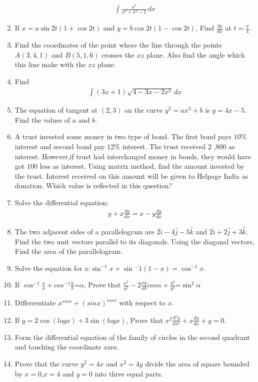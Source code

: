 \documentclass{article}
\begin{document}
\begin{enumerate}
	\begin{align*}
\int \frac{x^2}{x^4 + x^2 - 2} \, dx
		\end{align*}
\item If $x= a \sin 2t (1 + \cos 2t)$ and $y= b \cos 2t (1 - \cos 2t)$, Find $\frac{dy}{dx}$ at $ t = \frac{\pi}{4}$.
\item Find the coordinates of the point where the line through the points $ A(3,4,1) $ and $B(5,1,6)$ crosses the $xz$ plane. Also find the angle which this line make with the $xz$ plane.
\item Find \begin{align*}
		\int (3x+1)\sqrt {4-3x-2x^2} \, dx
\end{align*}
\item The equation of tangent at $(2,3)$ on the curve $y^2=ax^3+b$ is $y=4x-5$. Find the values of $a$ and $b$.
\item A trust invested some money in two type of bond. The first bond pays $10\%$ interest and second bond pay $12\%$ interest. The trust received \rupee $2$ ,$800$ as interest. However,if trust had interchanged money in bonds, they would have got \rupee $100$ less as interest. Using matrix method, find the amount invested by the trust. Interest received on this amount will be given to Helpage India as donation. Which value is reflected in this question?
\item Solve the differential equation:
	\begin{align*}
		y + x \frac{dy}{dx} = x - y \frac{dy}{dx}
	\end{align*}
\item The two adjacent sides of a parallelogram are  $ 2\hat{i}-4\hat{j}-5\hat{k} $ and $2\hat{i}+2\hat{j}+3\hat{k} $. Find the two unit vectors parallel to its diagonals. Using the diagonal vectors, Find the area of the parallelogram.
\item Solve the equation for x:$\sin^{-1}x+\sin{^-1}(1-x) = \cos^{-1}x$.
 \item If $\cos^{-1}\frac{x}{a}+cos^{-1}\frac{y}{b}$=$\alpha$, Prove that $\frac{x^2}{a^2}-2\frac{xy}{ab}cos\alpha+\frac{y^2}{b^2}$=$\sin^2\alpha$
 \item Differrentiate $x^{sinx}+(sinx)^{cosx}$ with respect to $x$.
 \item If $ y=2\cos(logx)+3\sin(logx)$, Prove that $x^2\frac{d^2y}{dx^2}+x\frac{dy}{dx}+y=0$.
 \item Form the differential equation of the family of circles in the second quadrant and touching the coordinate axes.
 \item Prove that the curve $y^2=4x$ and $x^2=4y$ divide the area of square bounded by $x=0$,$x=4$ and $y=0$ into three equal parts.

\end{enumerate}
\end{document}
